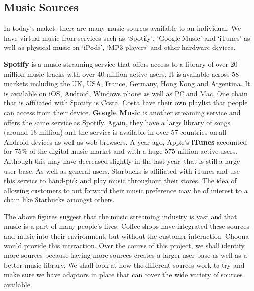 \subsection{\textbf{Music Sources}}
    In today's maket, there are many music sources available to an individual. We have virtual music from services such as `Spotify', `Google Music' and `iTunes' as well as physical music on `iPods', `MP3 players' and other hardware devices. 

    \textbf{Spotify} is a music streaming service that offers access to a library of over 20 million music tracks with over 40 million active users. It is available across 58 markets including the UK, USA, France, Germany, Hong Kong and Argentina. It is available on iOS, Android, Windows phone as well as PC and Mac. One chain that is affiliated with Spotify is Costa. Costa have their own playlist that people can access from their device. 
    \textbf{Google Music} is another streaming service and offers the same service as Spotify. Again, they have a large library of songs (around 18 million) and the service is available in over 57 countries on all Android devices as well as web browsers. 
    A year ago, Apple's \textbf{iTunes} accounted for 75\% of the digital music market and with a huge 575 million active users. Although this may have decreased slightly in the last year, that is still a large user base. As well as general users, Starbucks is affiliated with iTunes and use this service to hand-pick and play music throughout their stores. The idea of allowing customers to put forward their music preference may be of interest to a chain like Starbucks amongst others. 

    The above figures suggest that the music streaming industry is vast and that music is a part of many people's lives. Coffee shops have integrated these sources and music into their environment, but without the customer interaction. Choona would provide this interaction. Over the course of this project, we shall identify more sources because having more sources creates a larger user base as well as a better music library. We shall look at how the different sources work to try and make sure we have adaptors in place that can cover the wide variety of sources available. 

